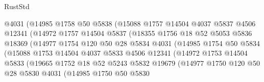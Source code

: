 \begin{lexlean}{RustStd}
\begin{coremodule}
                        @4031
                        (@14985
                          @1758
                          @50
                          @5838
                          (@15088
                            @1757
                            @14504
                            @4037
                            @5837
                            @4506
                            @12341
                            (@14972
                              @1757
                              @14504
                              @5837
                              (@18355
                                @1756
                                @18
                                @52
                                @5053
                                @5836
                                @18369
                                (@14977
                                  @1754
                                  @120
                                  @50
                                  @28
                                  @5834
                                  @4031
                                  (@14985
                                    @1754
                                    @50
                                    @5834
                                    (@15088
                                      @1753
                                      @14504
                                      @4037
                                      @5833
                                      @4506
                                      @12341
                                      (@14972
                                        @1753
                                        @14504
                                        @5833
                                        (@19665
                                          @1752
                                          @18
                                          @52
                                          @5243
                                          @5832
                                          @19679
                                          (@14977
                                            @1750
                                            @120
                                            @50
                                            @28
                                            @5830
                                            @4031
                                            (@14985
                                              @1750
                                              @50
                                              @5830

\end{coremodule}
\end{lexlean}
